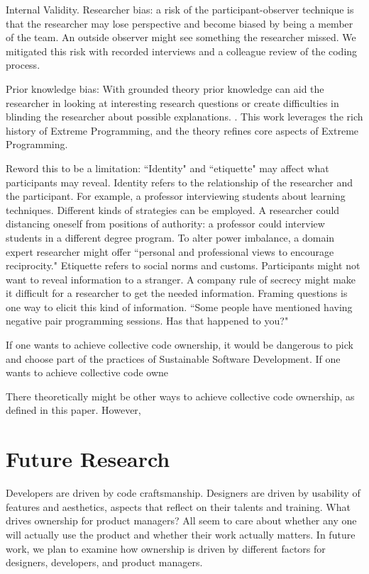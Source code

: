 Internal Validity. Researcher bias: a risk of the participant-observer technique is that the researcher may lose perspective and become biased by being a member of the team. An outside observer might see something the researcher missed. We mitigated this risk with recorded interviews and a colleague review of the coding process. 

Prior knowledge bias: With grounded theory prior knowledge can aid the researcher in looking at interesting research questions or create difficulties in blinding the researcher about possible explanations. \cite{GlaserIssues}. This work leverages the rich history of Extreme Programming, and the theory refines core aspects of Extreme Programming. 

Reword this to be a limitation: ``Identity" and ``etiquette" may affect what participants may reveal. Identity refers to the relationship of the researcher and the participant. For example, a professor interviewing students about learning techniques. Different kinds of strategies can be employed. A researcher could distancing oneself from positions of authority: a professor could interview students in a different degree program. To alter power imbalance, a domain expert researcher might offer ``personal and professional views to encourage reciprocity." Etiquette refers to social norms and customs. Participants might not want to reveal information to a stranger. A company rule of secrecy might make it difficult for a researcher to get the needed information. Framing questions is one way to elicit this kind of information. ``Some people have mentioned having negative pair programming sessions. Has that happened to you?" 


If one wants to achieve collective code ownership, it would be dangerous to pick and choose part of the practices of Sustainable Software Development. If one wants to achieve collective code owne

There theoretically might be other ways to achieve collective code ownership, as defined in this paper. However, 

\section{Future Research}
Developers are driven by code craftsmanship. Designers are driven by usability of features and aesthetics, aspects that reflect on their talents and training. What drives ownership for product managers? All seem to care about whether any one will actually use the product and whether their work actually matters. In future work,  we plan to examine how ownership is driven by different factors for designers, developers, and product managers.

